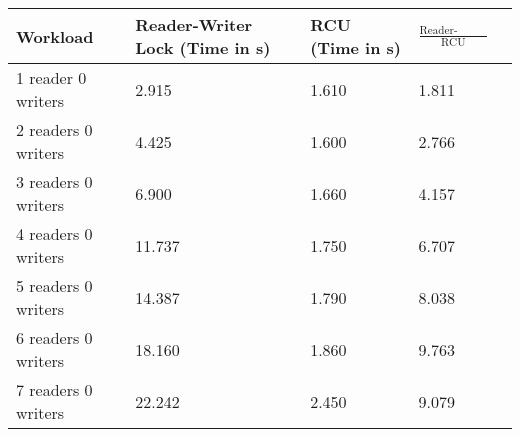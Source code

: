 \begin{tabular}{|l|l|l|l|l|}
\hline Workload &Reader-Writer Lock (Time in s) & RCU (Time in s) & $\frac{\mbox{Reader-Writer Lock}}{\mbox{RCU}} $ \\
\hline 1 reader 0 writers & 2.915 & 1.610&1.811\\
\hline 2 readers 0 writers & 4.425 & 1.600&2.766\\
\hline 3 readers 0 writers & 6.900 & 1.660&4.157\\
\hline 4 readers 0 writers & 11.737 & 1.750&6.707\\
\hline 5 readers 0 writers & 14.387 & 1.790&8.038\\
\hline 6 readers 0 writers & 18.160 & 1.860&9.763\\
\hline 7 readers 0 writers & 22.242 & 2.450&9.079\\
\hline
\end{tabular}
\label{tbl:xyz}
